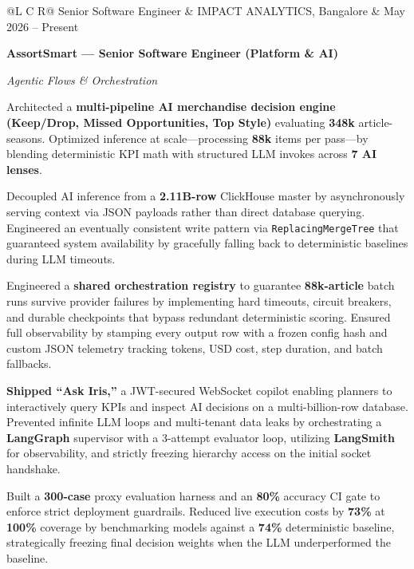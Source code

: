 
\noindent
\begin{tabularx}{\textwidth}{@{}L C R@{}}
\textcolor{role}{Senior Software Engineer} & \textcolor{company}{IMPACT ANALYTICS, Bangalore} & \textcolor{date}{May 2026 -- Present}\\
\end{tabularx}
\vspace{-1.35ex}

\textcolor{Project}{\textbf{AssortSmart --- Senior Software Engineer (Platform \& AI)}}
\vspace{0.25ex}

\textcolor{Project}{\textit{Agentic Flows \& Orchestration}}
\vspace{-0.65ex}
\begin{zitemize}
    \item Architected a \textbf{multi-pipeline AI merchandise decision engine (Keep/Drop, Missed Opportunities, Top Style)} evaluating \textbf{348k} article-seasons. Optimized inference at scale---processing \textbf{88k} items per pass---by blending deterministic KPI math with structured LLM invokes across \textbf{7 AI lenses}.
    \item Decoupled AI inference from a \textbf{2.11B-row} ClickHouse master by asynchronously serving context via JSON payloads rather than direct database querying. Engineered an eventually consistent write pattern via \texttt{ReplacingMergeTree} that guaranteed system availability by gracefully falling back to deterministic baselines during LLM timeouts.
    \item Engineered a \textbf{shared orchestration registry} to guarantee \textbf{88k-article} batch runs survive provider failures by implementing hard timeouts, circuit breakers, and durable checkpoints that bypass redundant deterministic scoring. Ensured full observability by stamping every output row with a frozen config hash and custom JSON telemetry tracking tokens, USD cost, step duration, and batch fallbacks.
    \item \textbf{Shipped ``Ask Iris,''} a JWT-secured WebSocket copilot enabling planners to interactively query KPIs and inspect AI decisions on a multi-billion-row database. Prevented infinite LLM loops and multi-tenant data leaks by orchestrating a \textbf{LangGraph} supervisor with a 3-attempt evaluator loop, utilizing \textbf{LangSmith} for observability, and strictly freezing hierarchy access on the initial socket handshake.
    \item Built a \textbf{300-case} proxy evaluation harness and an \textbf{80\%} accuracy CI gate to enforce strict deployment guardrails. Reduced live execution costs by \textbf{73\%} at \textbf{100\%} coverage by benchmarking models against a \textbf{74\%} deterministic baseline, strategically freezing final decision weights when the LLM underperformed the baseline.
\end{zitemize}

